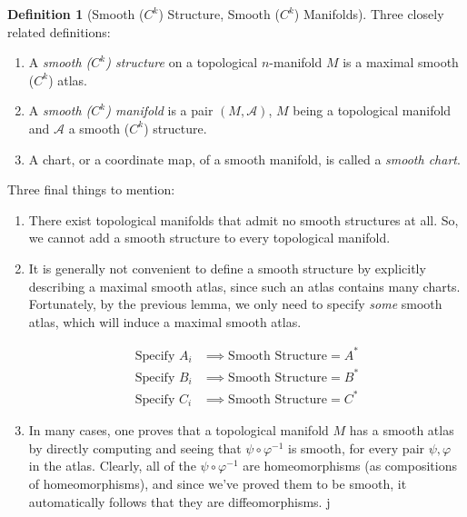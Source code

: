 \documentclass{article}
\theoremstyle{remark}
\theoremstyle{definition}
\newtheorem{definition}{Definition}[section]
\begin{document}
    \begin{definition}[Smooth ($C^k$) Structure, Smooth ($C^k$) Manifolds]
      Three closely related definitions: 
      \begin{enumerate}
        \item A \textit{smooth ($C^k$) structure} on a topological $n$-manifold $M$ is a maximal smooth ($C^k$) atlas.
        \item A \textit{smooth ($C^k$) manifold} is a pair $(M, \mathcal{A})$, $M$ being a topological manifold and $\mathcal{A}$ a smooth ($C^k$) structure. 
        \item A chart, or a coordinate map, of a smooth manifold, is called a \textit{smooth chart}. 
      \end{enumerate}
    \end{definition}

    Three final things to mention:
    \begin{enumerate}
      \item There exist topological manifolds that admit no smooth structures at all. So, we cannot add a smooth structure to every topological manifold. 

      \item It is generally not convenient to define a smooth structure by explicitly describing a maximal smooth atlas, since such an atlas contains many charts. Fortunately, by the previous lemma, we only need to specify \textit{some} smooth atlas, which will induce a maximal smooth atlas. 

      \begin{align*}
          \text{Specify } A_i & \implies \text{Smooth Structure} = A^*\\
          \text{Specify } B_i & \implies \text{Smooth Structure} = B^*\\
          \text{Specify } C_i & \implies \text{Smooth Structure} = C^*
      \end{align*}

      \item In many cases, one proves that a topological manifold $M$ has a smooth atlas by directly computing and seeing that $\psi \circ \varphi^{-1}$ is smooth, for every pair $\psi, \varphi$ in the atlas. Clearly, all of the $\psi \circ \varphi^{-1}$ are homeomorphisms (as compositions of homeomorphisms), and since we've proved them to be smooth, it automatically follows that they are diffeomorphisms. j
    \end{enumerate}
\end{document}
